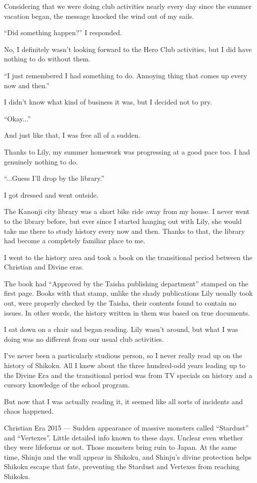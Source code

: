 Considering that we were doing club activities nearly every day since the summer vacation began, the message knocked the wind out of my sails.

``Did something happen?'' I responded.

No, I definitely wasn't looking forward to the Hero Club activities, but I did have nothing to do without them.

``I just remembered I had something to do. Annoying thing that comes up every now and then.''

I didn't know what kind of business it was, but I decided not to pry.

``Okay...''

And just like that, I was free all of a sudden.

Thanks to Lily, my summer homework was progressing at a good pace too. I had genuinely nothing to do.

``...Guess I'll drop by the library.''

I got dressed and went outside.

The Kanonji city library was a short bike ride away from my house. I never went to the library before, but ever since I started hanging out with Lily, she would take me there to study history every now and then. Thanks to that, the library had become a completely familiar place to me.

I went to the history area and took a book on the transitional period between the Christian and Divine eras.

The book had ``Approved by the Taisha publishing department'' stamped on the first page. Books with that stamp, unlike the shady publications Lily usually took out, were properly checked by the Taisha, their contents found to contain no issues. In other words, the history written in them was based on true documents.

I sat down on a chair and began reading. Lily wasn't around, but what I was doing was no different from our usual club activities.

I've never been a particularly studious person, so I never really read up on the history of Shikoku. All I knew about the three hundred-odd years leading up to the Divine Era and the transitional period was from TV specials on history and a cursory knowledge of the school program.

But now that I was actually reading it, it seemed like all sorts of incidents and chaos happened.

Christian Era 2015 --- Sudden appearance of massive monsters called ``Stardust'' and ``Vertexes''. Little detailed info known to these days. Unclear even whether they were lifeforms or not. Those monsters bring ruin to Japan. At the same time, Shinju and the wall appear in Shikoku, and Shinju's divine protection helps Shikoku escape that fate, preventing the Stardust and Vertexes from reaching Shikoku.

